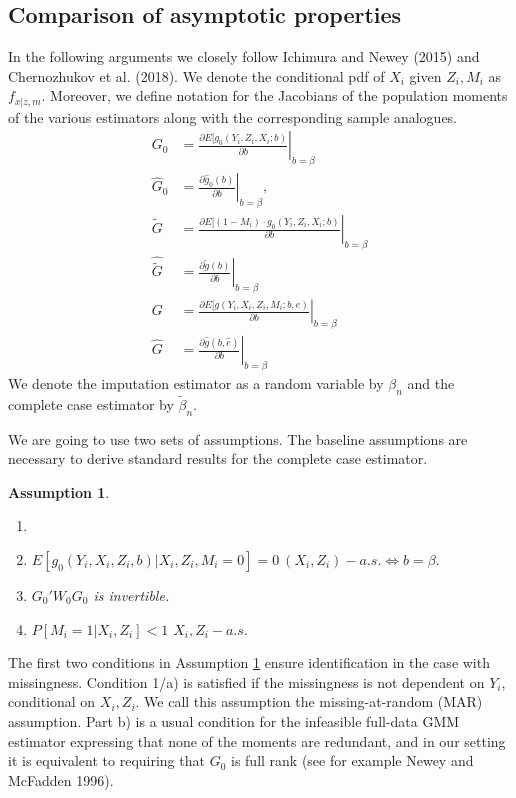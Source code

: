 \documentclass{article}
\newtheorem{assumption}{Assumption}
\theoremstyle{definition}
\theoremstyle{remark}
\begin{document}
\subsection{Comparison of asymptotic properties}
In the following arguments we closely follow Ichimura and Newey (2015) and Chernozhukov et al. (2018). We denote the conditional pdf of $X_i$ given $Z_i, M_i$ as $f_{x|z,m}$. Moreover, we define notation for the Jacobians of the population moments of the various estimators along with the corresponding sample analogues. 
\begin{align*}
G_0 &= \left.\frac{\partial E[g_0(Y_i, Z_i, X_i; b)}{\partial b}\right|_{b=\beta} \\
\hat{G}_0 &= \left.\frac{\partial \hat{g}_0(b)}{\partial b}\right|_{b=\beta},\\
\tilde{G} &= \left.\frac{\partial E[(1-M_i)\cdot g_0(Y_i, Z_i, X_i; b)}{\partial b}\right|_{b=\beta} \\
\hat{\tilde{G}} &= \left.\frac{\partial \tilde{g}(b)}{\partial b}\right|_{b=\beta}\\
G &= \left.\frac{\partial E[g(Y_i, X_i, Z_i, M_i; b, e)}{\partial b}\right|_{b=\beta}\\
\hat{G} &= \left.\frac{\partial \hat{g}(b, \hat{e})}{\partial b}\right|_{b=\beta}
\end{align*}
We denote the imputation estimator as a random variable by $\beta_n$ and the complete case estimator by $\tilde{\beta}_n$.

We are going to use two sets of assumptions. The baseline assumptions are necessary to derive standard results for the complete case estimator.
\begin{assumption}\label{ass_baseline}
\begin{enumerate}
\item[]
\item[a)] $E[g_0(Y_i, X_i, Z_i, b)|X_i, Z_i, M_i=0] = 0 \ (X_i, Z_i)-a.s. \Leftrightarrow b=\beta.$
\item[b)] $G_0'W_0G_0$ is invertible.
\item[c)] $P[M_i=1|X_i,Z_i]<1$ $X_i,Z_i-a.s.$
\end{enumerate}
\end{assumption}
The first two conditions in Assumption \ref{ass_baseline} ensure identification in the case with missingness. Condition 1/a) is satisfied if the missingness is not dependent on $Y_i$, conditional on $X_i, Z_i$. We call this assumption the missing-at-random (MAR) assumption. Part b) is a usual condition for the infeasible full-data GMM estimator expressing that none of the moments are redundant, and in our setting it is equivalent to requiring that $G_0$ is full rank (see for example Newey and McFadden 1996).
\end{document}
